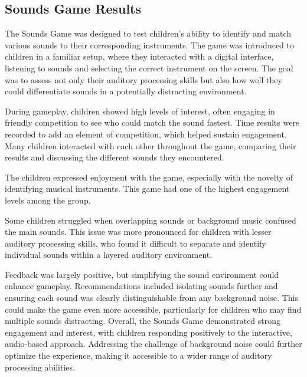 % 




\newpage
\subsection{Sounds Game Results}

The Sounds Game was designed to test children's ability to identify and match various sounds to their corresponding instruments. The game was introduced to children in a familiar setup, where they interacted with a digital interface, listening to sounds and selecting the correct instrument on the screen. The goal was to assess not only their auditory processing skills but also how well they could differentiate sounds in a potentially distracting environment.

During gameplay, children showed high levels of interest, often engaging in friendly competition to see who could match the sound fastest. Time results were recorded to add an element of competition, which helped sustain engagement. Many children interacted with each other throughout the game, comparing their results and discussing the different sounds they encountered.

The children expressed enjoyment with the game, especially with the novelty of identifying musical instruments. This game had one of the highest engagement levels among the group.

Some children struggled when overlapping sounds or background music confused the main sounds. This issue was more pronounced for children with lesser auditory processing skills, who found it difficult to separate and identify individual sounds within a layered auditory environment.

Feedback was largely positive, but simplifying the sound environment could enhance gameplay. Recommendations included isolating sounds further and ensuring each sound was clearly distinguishable from any background noise. This could make the game even more accessible, particularly for children who may find multiple sounds distracting.
Overall, the Sounds Game demonstrated strong engagement and interest, with children responding positively to the interactive, audio-based approach. Addressing the challenge of background noise could further optimize the experience, making it accessible to a wider range of auditory processing abilities.


